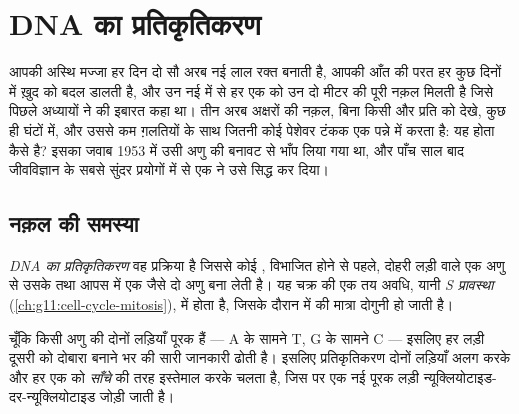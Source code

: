 \chapter{DNA का प्रतिकृतिकरण}\label{ch:g11:dna-replication}

आपकी अस्थि मज्जा हर दिन दो सौ अरब नई लाल रक्त  बनाती है, आपकी
आँत की परत हर कुछ दिनों में ख़ुद को बदल डालती है, और उन नई  में
से हर एक को उन दो मीटर  की पूरी नक़ल मिलती है जिसे पिछले अध्यायों ने
 की इबारत कहा था। तीन अरब अक्षरों की नक़ल, बिना किसी और प्रति को
देखे, कुछ ही घंटों में, और उससे कम ग़लतियों के साथ जितनी कोई पेशेवर
टंकक एक पन्ने में करता है: यह होता कैसे है? इसका जवाब 1953 में उसी अणु की
बनावट से भाँप लिया गया था, और पाँच साल बाद जीवविज्ञान के सबसे सुंदर
प्रयोगों में से एक ने उसे सिद्ध कर दिया।

\section{नक़ल की समस्या}

\begin{definition}[प्रतिकृतिकरण]\label{def:g11:dna-replication:replication}
\emph{DNA का प्रतिकृतिकरण} वह प्रक्रिया है जिससे
कोई , विभाजित होने से पहले, दोहरी लड़ी वाले एक  अणु से उसके तथा
आपस में एक जैसे दो अणु बना लेती है। यह  चक्र की एक तय अवधि, यानी
\emph{S प्रावस्था} (\cref{ch:g11:cell-cycle-mitosis}), में होता है,
जिसके दौरान  में  की मात्रा दोगुनी हो जाती है।
\end{definition}

\begin{proposition}[साँचे का सिद्धांत]\label{prop:g11:dna-replication:template}
चूँकि किसी  अणु की दोनों लड़ियाँ पूरक हैं --- A के सामने T, G के सामने
C --- इसलिए हर लड़ी दूसरी को दोबारा बनाने भर की सारी जानकारी ढोती है।
इसलिए प्रतिकृतिकरण दोनों लड़ियाँ अलग करके और हर एक को \emph{साँचे} की
तरह इस्तेमाल करके चलता है, जिस पर एक नई पूरक लड़ी न्यूक्लियोटाइड-दर-न्यूक्लियोटाइड
जोड़ी जाती है।
\end{proposition}
\admitted

